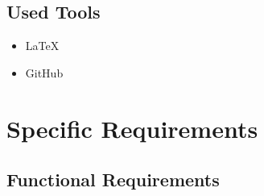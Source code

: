 \documentclass[english]{article}
\begin{document}
	\subsection{Used Tools}
	\begin{itemize}
		\item \LaTeX\\
		\item GitHub\\
	\end{itemize}
\section{Specific Requirements}
	\subsection{Functional Requirements}
	
\end{document}
